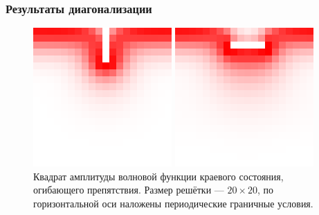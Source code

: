 \documentclass{beamer}
\begin{document}
\begin{frame}
    \frametitle{Результаты диагонализации}
    \begin{figure}[h]
        \centering
        \begin{minipage}[t]{0.4\linewidth}
            \includegraphics[width=0.9\linewidth]{obstacle_1.png}
        \end{minipage}
        \hfill
        \begin{minipage}[t]{0.4\linewidth}
            \includegraphics[width=0.9\linewidth]{obstacle_2.png}
        \end{minipage}
        \caption{
            Квадрат амплитуды волновой функции краевого состояния, огибающего препятствия. 
            Размер решётки --- $20\times20$, по горизонтальной оси наложены периодические
            граничные условия.
        }
        \label{fig:obstacle}
    \end{figure}
\end{frame}
\end{document}
